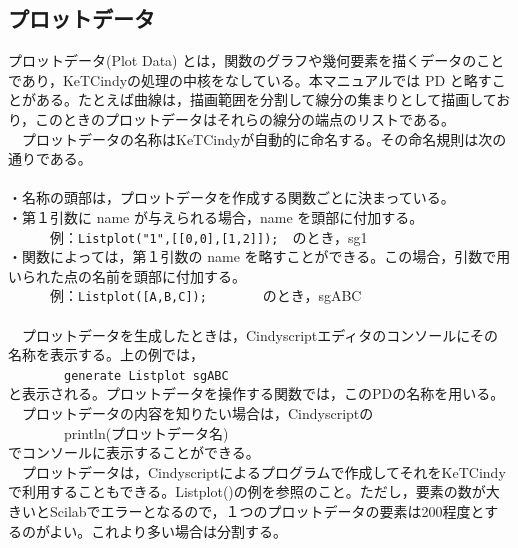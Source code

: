 \documentclass[papersize,a4paper,12pt,uplatex]{jsarticle}
\begin{document}
\subsection{プロットデータ} 
プロットデータ(Plot Data) とは，関数のグラフや幾何要素を描くデータのことであり，KeTCindyの処理の中核をなしている。本マニュアルでは PD と略すことがある。たとえば曲線は，描画範囲を分割して線分の集まりとして描画しており，このときのプロットデータはそれらの線分の端点のリストである。\\
　プロットデータの名称はKeTCindyが自動的に命名する。その命名規則は次の通りである。\\
\\
・名称の頭部は，プロットデータを作成する関数ごとに決まっている。\\
・第１引数に name が与えられる場合，name を頭部に付加する。\\
　　　例：\verb|Listplot("1",[[0,0],[1,2]]);|　のとき，sg1\\
・関数によっては，第１引数の name を略すことができる。この場合，引数で用いられた点の名前を頭部に付加する。\\
　　　例：\verb|Listplot([A,B,C]);|　　　　のとき，sgABC\\
　\\
　プロットデータを生成したときは，Cindyscriptエディタのコンソールにその名称を表示する。上の例では，\\
　　　　\verb|generate Listplot sgABC|\\
と表示される。プロットデータを操作する関数では，このPDの名称を用いる。\\
　プロットデータの内容を知りたい場合は，Cindyscriptの\\
　　　　println(プロットデータ名)\\
でコンソールに表示することができる。\\
　プロットデータは，Cindyscriptによるプログラムで作成してそれをKeTCindyで利用することもできる。Listplot()の例を参照のこと。ただし，要素の数が大きいとScilabでエラーとなるので，１つのプロットデータの要素は200程度とするのがよい。これより多い場合は分割する。\\
\end{document}
